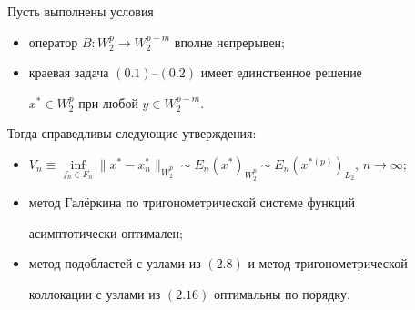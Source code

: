 \begin{thm}


Пусть выполнены условия


\begin{itemize}


\item[1)] оператор $B:W^p_2\to W^{p-m}_2$ вполне непрерывен$;$


\item[2)] краевая задача $(0.1)$--$(0.2)$ имеет единственное решение


$x^*\in W^p_2$ при любой $y\in W^{p-m}_2$.


\end{itemize}


Тогда справедливы следующие утверждения\/${:}$


\begin{itemize}


\item[а)] $V_n\equiv\inf\limits_{f_n\in F_n}\|x^*-x^*_n\|_{W^p_2}


\sim E_n(x^*)_{W^p_2}\sim E_n(x^{*(p)})_{L_2}$, $n\to\infty;$


\item[б)] метод Гал\"еркина по тригонометрической системе функций


асимптотически оптимален\/$;$


\item[в)] метод подобластей с узлами из $(2.8)$ и метод тригонометрической


коллокации с узлами из $(2.16)$ оптимальны по порядку.


\end{itemize}


\end{thm}





